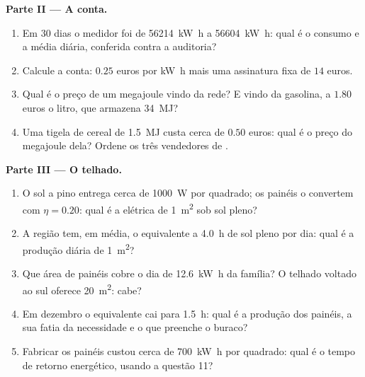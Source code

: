 \begin{problem}
\medskip
\noindent\textbf{Parte II --- A conta.}
\begin{enumerate}[resume]
  \item Em 30 dias o medidor foi de \qty{56214}{kW.h} a
        \qty{56604}{kW.h}: qual é o consumo e a média diária, conferida
        contra a auditoria?
  \item Calcule a conta: $0.25$ euros por \unit{kW.h} mais uma
        assinatura fixa de $14$ euros.
  \item Qual é o preço de um megajoule vindo da rede? E vindo da
        gasolina, a $1.80$ euros o litro, que armazena \qty{34}{MJ}?
  \item Uma tigela de cereal de \qty{1.5}{MJ} custa cerca de $0.50$
        euros: qual é o preço do megajoule dela? Ordene os três
        vendedores de .
\end{enumerate}

\medskip
\noindent\textbf{Parte III --- O telhado.}
\begin{enumerate}[resume]
  \item O sol a pino entrega cerca de \qty{1000}{W} por  quadrado;
        os painéis o convertem com $\eta = 0.20$: qual é a 
        elétrica de \qty{1}{m^2} sob sol pleno?
  \item A região tem, em média, o equivalente a \qty{4.0}{h} de sol pleno
        por dia: qual é a produção diária de \qty{1}{m^2}?
  \item Que área de painéis cobre o dia de \qty{12.6}{kW.h} da família? O
        telhado voltado ao sul oferece \qty{20}{m^2}: cabe?
  \item Em dezembro o equivalente cai para \qty{1.5}{h}: qual é a
        produção dos painéis, a sua fatia da necessidade e o que preenche
        o buraco?
  \item Fabricar os painéis custou cerca de \qty{700}{kW.h} por 
        quadrado: qual é o tempo de retorno energético, usando a questão
        11?
\end{enumerate}


\end{problem}
